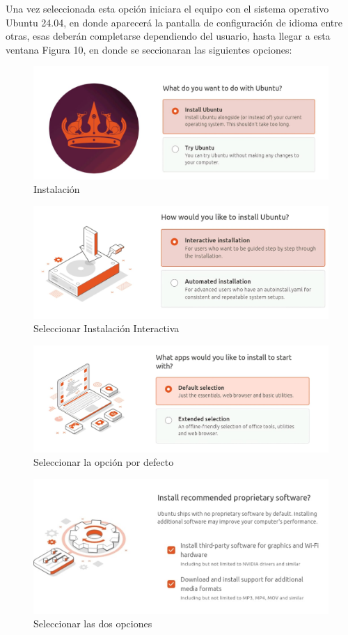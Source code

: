 \documentclass[letter,11pt]{article} %
\begin{document}
\begin{enumerate}
		Una vez seleccionada esta opción iniciara el equipo con el sistema operativo Ubuntu 24.04, en donde aparecerá la pantalla de configuración de idioma entre otras, esas deberán completarse dependiendo del usuario, hasta llegar a esta ventana Figura 10, en donde se seccionaran las siguientes opciones:
		
		\begin{figure}[H]
			\centering
			\includegraphics[width=0.5\linewidth]{Imagenes/in1}
			\caption{Instalación}
			\label{fig:in1}
		\end{figure}
		
		\begin{figure}[H]
			\centering
			\includegraphics[width=0.5\linewidth]{Imagenes/interactive}
			\caption{Seleccionar Instalación Interactiva}
			\label{fig:interactive}
		\end{figure}
		
		\begin{figure}[H]
			\centering
			\includegraphics[width=0.5\linewidth]{Imagenes/manual}
			\caption{Seleccionar la opción por defecto}
			\label{fig:manual}
		\end{figure}
		
		\begin{figure}[H]
			\centering
			\includegraphics[width=0.5\linewidth]{Imagenes/paqueterias}
			\caption{Seleccionar las dos opciones}
			\label{fig:paqueterias}
		\end{figure}
		

\end{enumerate}
\end{document}
